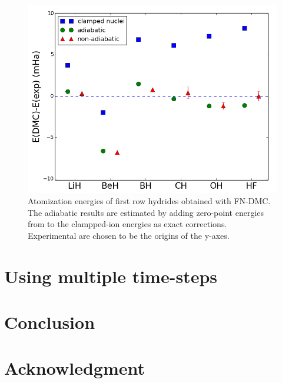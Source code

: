 \documentclass[pra,superscriptaddress,groupedaddress,twocolumn]{revtex4}
\begin{document}
\begin{figure}
\centering
\includegraphics[scale=.4]{Figures/atomization}
\caption{Atomization energies of first row hydrides obtained with FN-DMC. The adiabatic results are estimated by adding zero-point energies from \cite{Feller_Corrections} to the clampped-ion energies as exact corrections. Experimental are chosen to be the origins of the y-axes.}
\end{figure}


 


\section{Using multiple time-steps}


\section{Conclusion}
 

\section{Acknowledgment}



\end{document}
